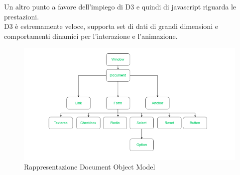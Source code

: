 {Un altro punto a favore dell'impiego di D3 e quindi di javascript riguarda le prestazioni.\\
D3 è estremamente veloce, supporta set di dati di grandi dimensioni e comportamenti dinamici per l'interazione e l'animazione.
\begin{figure}[!htb]
	\begin{center}
		\includegraphics[width=1 \linewidth]{figure/dom}
	\end{center}
	\caption{Rappresentazione Document Object Model\label{fig:dom}}
\end{figure}
}
